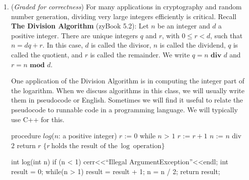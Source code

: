 \documentclass[12pt, oneside]{article}
\begin{document}
\begin{enumerate}
\item ({\it Graded for correctness}) For many applications in cryptography and random number generation,
dividing very large integers efficiently is critical.  Recall {\bf The Division Algorithm} (zyBook 5.2):
 Let $n$ be an integer 
and $d$ a positive integer. There are unique integers $q$ and $r$, with $0 \leq r < d$, such that 
$n = dq + r$. In this case, $d$ is called the divisor, $n$ is called the dividend, $q$ is called the quotient, 
and $r$ is called the remainder. We write $q=n \textbf{ div } d$ and $r=n \textbf{ mod } d$.

One application of the Division Algorithm is in computing the integer part of the logarithm.
When we discuss algorithms in this class, we will usually write them in 
pseudocode or English. Sometimes we will find it useful to relate the pseudocode to
runnable code in a programming language. We will typically use C++ for this.

\label{algo_division}

\begin{multicols}{2}
\begin{algorithm}[caption={Calculating log in pseudocode}]
procedure $\textit{log}$($n$: a positive integer)
$r$ := $0$
while $n$ > $1$
  $r$ := $r + 1$
  $n$ := $n$ div $2$
return $r$ $\{ r~\textrm{holds the result of the}~\log~\textrm{operation}\} $
\end{algorithm}
\columnbreak
\begin{java}[caption={Calculating log in C++}]
int log(int n) {
  if (n < 1) { 
    cerr<<``Illegal ArgumentException''<<endl; 
  }
  int result = 0;
  while(n > 1) {
    result = result + 1;
    n = n / 2;
  }
  return result;
}
\end{java}
\end{multicols}



\end{enumerate}
\end{document}
